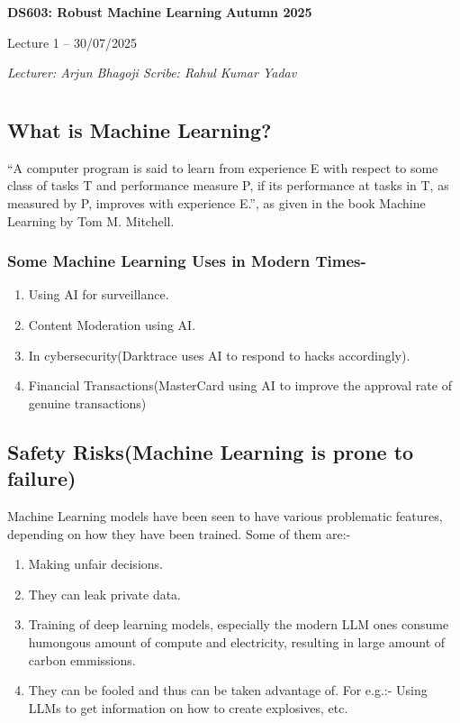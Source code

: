 \documentclass[11pt]{article}
\theoremstyle{plain} %
\begin{document}
\thispagestyle{plain}

\begin{tcolorbox}[colback=white, colframe=black, boxrule=1pt, sharp corners]
\textbf{DS603: Robust Machine Learning} \hfill \textbf{Autumn 2025}
\begin{center}
\vspace{2mm}
Lecture 1 -- 30/07/2025
\end{center}
\vspace{2mm}
\noindent\textit{Lecturer: Arjun Bhagoji \hfill Scribe: Rahul Kumar Yadav}
\end{tcolorbox}

\section*{}
\addtocounter{section}{1}

\subsection{\Large{\bfseries What is Machine Learning?}}
“A computer program is said to learn from experience E with respect to some class of tasks T and performance measure P, if its performance at tasks in T, as measured by P, improves with experience E.”, as given in the book Machine Learning by Tom M. Mitchell.

\subsubsection{Some Machine Learning Uses in Modern Times-}
\begin{enumerate}
  \item Using AI for surveillance.
  \item Content Moderation using AI.
  \item In cybersecurity(Darktrace uses AI to respond to hacks accordingly).
  \item Financial Transactions(MasterCard using AI to improve the approval rate of genuine transactions)
\end{enumerate}

\subsection{\Large{\bfseries Safety Risks(Machine Learning is prone to failure)}}
Machine Learning models have been seen to have various problematic features, depending on how they have been trained. Some of them are:-
\begin{enumerate}
  \item Making unfair decisions.
  \item They can leak private data.
  \item Training  of deep learning models, especially the modern LLM ones consume humongous amount of compute and electricity, resulting in large amount of carbon emmissions.
  \item They can be fooled and thus can be taken advantage of. For e.g.:- Using LLMs to get information on how to create explosives, etc.
\end{enumerate}
\end{document}
